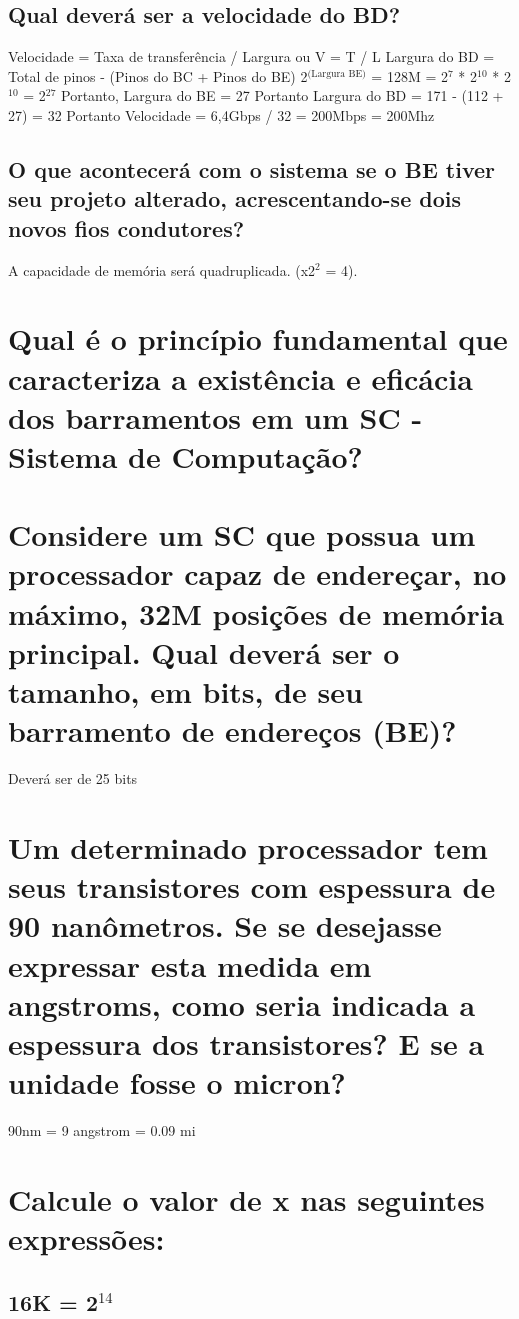 \documentclass[
	12pt,				%
	openright,			%
	twoside,			%
	a4paper,			%
	english,			%
	french,				%
	spanish,			%
	brazil,				%
	]{abntex2}
\begin{document}
\subsection{Qual deverá ser a velocidade do BD?}
\label{sec:org3e5a83d}
Velocidade = Taxa de transferência / Largura ou V = T / L
Largura do BD = Total de pinos - (Pinos do BC + Pinos do BE)
2\(^{\text{(Largura BE)}}\) = 128M = 2\(^{\text{7}}\) * 2\(^{\text{10}}\) * 2\(^{\text{10}}\) = 2\(^{\text{27}}\)
Portanto, Largura do BE = 27
Portanto Largura do BD = 171 - (112 + 27) = 32
Portanto Velocidade = 6,4Gbps / 32 = 200Mbps = 200Mhz
\subsection{O que acontecerá com o sistema se o BE tiver seu projeto alterado, acrescentando-se dois novos fios condutores?}
\label{sec:org23b6461}
A capacidade de memória será quadruplicada. (x2\(^{\text{2}}\) = 4).
\section{Qual é o princípio fundamental que caracteriza a existência e eficácia dos barramentos em um SC - Sistema de Computação?}
\label{sec:org4c00886}

\section{Considere um SC que possua um processador capaz de endereçar, no máximo, 32M posições de memória principal. Qual deverá ser o tamanho, em bits, de seu barramento de endereços (BE)?}
\label{sec:org50fe15f}
Deverá ser de 25 bits
\section{Um determinado processador tem seus transistores com espessura de 90 nanômetros. Se se desejasse expressar esta medida em angstroms, como seria indicada a espessura dos transistores? E se a unidade fosse o micron?}
\label{sec:org7ba105d}
90nm = 9 angstrom = 0.09 mi
\section{Calcule o valor de x nas seguintes expressões:}
\label{sec:orgb4122f5}
\subsection{16K = 2\(^{\text{14}}\)}
\label{sec:org42bab4d}
\end{document}
